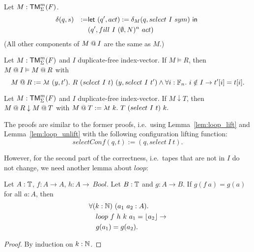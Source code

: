 \begin{definition}[$\LiftTapes{M}{I}$]
  \label{def:LiftTapes}
  Let $M:\textsf{TM}_\Sigma^m(F)$.
  \begin{alignat*}{2}
    &\delta(q,s) &:=& \Let{(q', act) := \delta_M(q, select~I~sym)}{\\%
    &            &  & (q', fill~I~(\None,N)^n~act)}
  \end{alignat*}
  (All other components of $\LiftTapes{M}{I}$ are the same as $M$.)
\end{definition}

\begin{lemma}
  \label{lem:LiftTapes_Realise}
  Let $M : \textsf{TM}_\Sigma^m(F)$ and $I$ duplicate-free index-vector.  If $M \vDash R$, then $M \mathbin{@} I \vDash M \mathbin{@} R$ with
  \[
    M \mathbin{@} R := \lambda t~(y,t').~ R~(select~I~t)~(y, select~I~t') \land \forall i:\mathbb{F}_n.~i \notin I \rightarrow t'[i]=t[i].
  \]
\end{lemma}

\begin{lemma}
  \label{lem:LiftTapes_TerminatesIn}
  Let $M : \textsf{TM}_\Sigma^m(F)$ and $I$ duplicate-free index-vector. If $M \downarrow T$, then $M \mathbin{@} R \downarrow M \mathbin{@} T$ with
  $
    M \mathbin{@} T := \lambda t~k.~ T~(select~I~t)~k.
  $
\end{lemma}

The proofs are similar to the former proofs, i.e.\ using Lemma~\ref{lem:loop_lift} and Lemma~\ref{lem:loop_unlift} with the following configuration
lifting function:
\[
  selectConf(q,t) := (q, select~I~t).
\]

However, for the second part of the correctness, i.e.\ tapes that are not in $I$ do not change, we need another lemma about $loop$:

\begin{lemma}
  \label{lem:loop_map}
  Let $A:\mathbb{T}$, $f:A \to A$, $h:A \to\ Bool$.  Let $B:\mathbb{T}$ and $g : A \to B$.  If $g(f~a)=g(a)$ for all $a:A$, then
  \begin{alignat*}{1}
    & \forall (k:\mathbb{N})~(a_1~a_2 : A). \\
    & \quad loop~f~h~k~a_1 = \left\lfloor {a_2} \right\rfloor \rightarrow \\
    & \quad g(a_1) = g(a_2).
  \end{alignat*}
\end{lemma}
\begin{proof}
  By induction on $k:\mathbb{N}$.
\end{proof}

